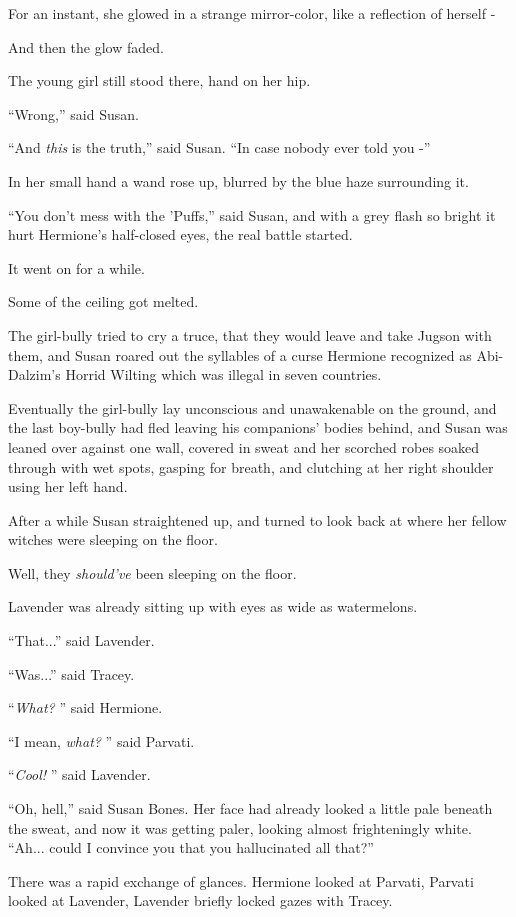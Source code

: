 For an instant, she glowed in a strange mirror-color, like a reflection
of herself -

And then the glow faded.

The young girl still stood there, hand on her hip.

``Wrong,'' said Susan.

``And \emph{this} is the truth,'' said Susan. ``In case nobody ever told
you -''

In her small hand a wand rose up, blurred by the blue haze surrounding
it.

``You don't mess with the 'Puffs,'' said Susan, and with a grey flash so
bright it hurt Hermione's half-closed eyes, the real battle started.

It went on for a while.

Some of the ceiling got melted.

The girl-bully tried to cry a truce, that they would leave and take
Jugson with them, and Susan roared out the syllables of a curse Hermione
recognized as Abi-Dalzim's Horrid Wilting which was illegal in seven
countries.

Eventually the girl-bully lay unconscious and unawakenable on the
ground, and the last boy-bully had fled leaving his companions' bodies
behind, and Susan was leaned over against one wall, covered in sweat and
her scorched robes soaked through with wet spots, gasping for breath,
and clutching at her right shoulder using her left hand.

After a while Susan straightened up, and turned to look back at where
her fellow witches were sleeping on the floor.

Well, they \emph{should've} been sleeping on the floor.

Lavender was already sitting up with eyes as wide as watermelons.

``That...'' said Lavender.

``Was...'' said Tracey.

``\emph{What?} '' said Hermione.

``I mean, \emph{what?} '' said Parvati.

``\emph{Cool!} '' said Lavender.

``Oh, hell,'' said Susan Bones. Her face had already looked a little
pale beneath the sweat, and now it was getting paler, looking almost
frighteningly white. ``Ah... could I convince you that you
hallucinated all that?''

There was a rapid exchange of glances. Hermione looked at Parvati,
Parvati looked at Lavender, Lavender briefly locked gazes with Tracey.

